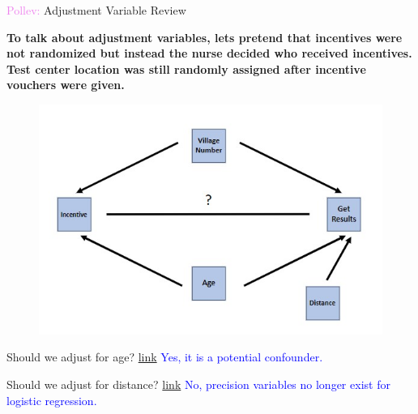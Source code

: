\documentclass[10pt,t]{beamer}
\begin{document}
\begin{frame}{\textcolor{violet}{Pollev:} Adjustment Variable Review}
	
	\vspace{-5 mm}
	
	\textbf{To talk about adjustment variables, lets pretend that incentives were not randomized but instead the nurse decided who received incentives. Test center location was still randomly assigned after incentive vouchers were given.}
	
	
	\begin{figure}
		\centering
		\includegraphics[scale = 0.35]{./figs/HIV_dag}
	\end{figure}
	
	Should we adjust for age? \textcolor{purple}{\href{https://PollEv.com/multiple_choice_polls/lzWdMlCQVpYspRIGYrxZF/respond}{link}} \pause \textcolor{blue}{Yes, it is a potential confounder.}
	
	\medskip
	
	Should we adjust for distance? \textcolor{purple}{\href{https://PollEv.com/multiple_choice_polls/G6ujbX4n8V7eSjwyNysEe/respond}{link}} \pause \textcolor{blue}{No, precision variables no longer exist for logistic regression.}
	
\end{frame}

%	
%	 
\end{document}
